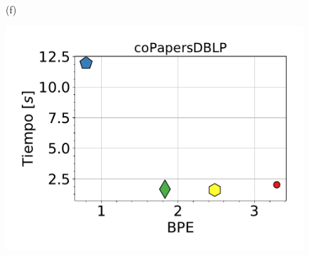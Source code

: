 \begin{figure}
\begin{minipage}{1\textwidth}
\begin{minipage}{0.45\textwidth}
    			(f)
    		\end{minipage}  
    	\end{minipage}
    	
        \begin{minipage}{1\textwidth}
    		\centering
    		\begin{minipage}{0.45\textwidth}
    			\centering
    			\begin{minipage}{0.75\textwidth}
    				\centering
    				\includegraphics[width=1\linewidth]{img/bpeTimes/secuencial/coPapersDBLP.pdf}
    			\end{minipage}
    			\begin{minipage}{0.2\textwidth}
    				\centering

\end{minipage}
\end{minipage}
\end{minipage}
\end{figure}
